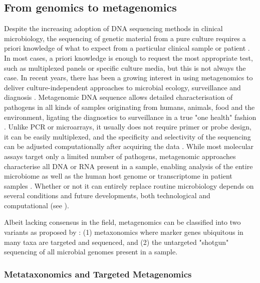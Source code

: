 \subsection{From genomics to metagenomics} \label{ssec:metagenomics}

Despite the increasing adoption of DNA sequencing methods in clinical microbiology, the sequencing of genetic material from a pure culture requires a priori knowledge of what to expect from a particular clinical sample or patient \citep{schuele_future_2021}. In most cases, a priori knowledge is enough to request the most appropriate test, such as multiplexed panels or specific culture media, but this is not always the case. In recent years, there has been a growing interest in using metagenomics to deliver culture-independent approaches to microbial ecology, surveillance and diagnosis \citep{loman_twenty_2015, loman_high-throughput_2012}.
Metagenomic DNA sequence allows detailed characterisation of pathogens in all kinds of samples originating from humans, animals, food and the environment, ligating the diagnostics to surveillance in a true "one health" fashion \citep{rossen__2018}. Unlike PCR or microarrays, it usually does not require primer or probe design, it can be easily multiplexed, and the specificity and selectivity of the sequencing can be adjusted computationally after acquiring the data \citep{dunne_next-generation_2012}.  While most molecular assays target only a limited number of pathogens, metagenomic approaches characterise all DNA or RNA present in a sample, enabling analysis of the entire microbiome as well as the human host genome or transcriptome in patient samples \citep{chiu_clinical_2019}. Whether or not it can entirely replace routine microbiology depends on several conditions and future developments, both technological and computational (see ).

Albeit lacking consensus in the field, metagenomics can be classified into two variants as proposed by \citep{marchesi_vocabulary_2015}: (1) metaxonomics where marker genes ubiquitous in many taxa are targeted and sequenced, and (2) the untargeted "shotgun" sequencing of all microbial genomes present in a sample. 

\subsubsection{Metataxonomics and Targeted Metagenomics} \label{sssec:metataxonomics}

